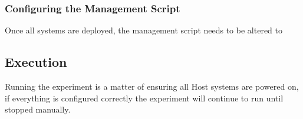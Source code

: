 \subsubsection{Configuring the Management Script}

Once all systems are deployed, the management script needs to be altered to

\subsection{Execution}

Running the experiment is a matter of ensuring all Host systems are powered on, if everything is configured correctly the experiment will continue to run until stopped manually.
